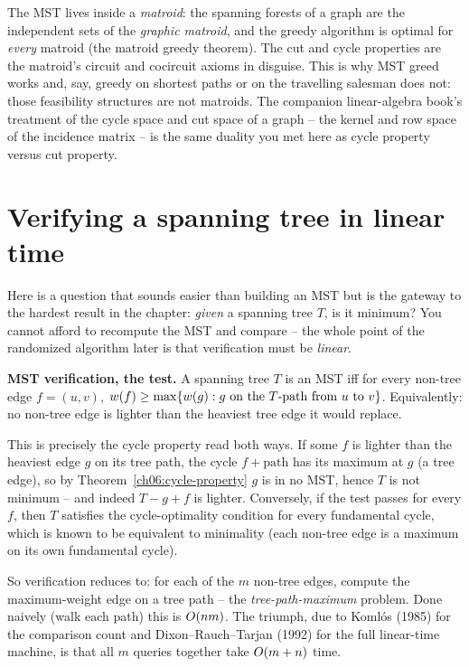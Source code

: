\begin{connectionbox}
The MST lives inside a \emph{matroid}: the spanning forests of a graph are the independent sets of the \emph{graphic matroid}, and the greedy algorithm is optimal for \emph{every} matroid (the matroid greedy theorem). The cut and cycle properties are the matroid's circuit and cocircuit axioms in disguise. This is why MST greed works and, say, greedy on shortest paths or on the travelling salesman does not: those feasibility structures are not matroids. The companion linear-algebra book's treatment of the cycle space and cut space of a graph -- the kernel and row space of the incidence matrix -- is the same duality you met here as cycle property versus cut property.
\end{connectionbox}

\section{Verifying a spanning tree in linear time}
\label{ch06:verify}

Here is a question that sounds easier than building an MST but is the gateway to the hardest result in the chapter: \emph{given} a spanning tree $T$, is it minimum? You cannot afford to recompute the MST and compare -- the whole point of the randomized algorithm later is that verification must be \emph{linear}.

\begin{focusbox}
\textbf{MST verification, the test.} A spanning tree $T$ is an MST iff for every non-tree edge $f=(u,v)$, $w(f)\ge\max\{w(g):g\text{ on the }T\text{-path from }u\text{ to }v\}$. Equivalently: no non-tree edge is lighter than the heaviest tree edge it would replace.
\end{focusbox}

\begin{whybox}
This is precisely the cycle property read both ways. If some $f$ is lighter than the heaviest edge $g$ on its tree path, the cycle $f+\text{path}$ has its maximum at $g$ (a tree edge), so by Theorem~\ref{ch06:cycle-property} $g$ is in no MST, hence $T$ is not minimum -- and indeed $T-g+f$ is lighter. Conversely, if the test passes for every $f$, then $T$ satisfies the cycle-optimality condition for every fundamental cycle, which is known to be equivalent to minimality (each non-tree edge is a maximum on its own fundamental cycle).
\end{whybox}

So verification reduces to: for each of the $m$ non-tree edges, compute the maximum-weight edge on a tree path -- the \emph{tree-path-maximum} problem. Done naively (walk each path) this is $O(nm)$. The triumph, due to Koml\'os (1985) for the comparison count and Dixon--Rauch--Tarjan (1992) for the full linear-time machine, is that all $m$ queries together take $O(m+n)$ time.

